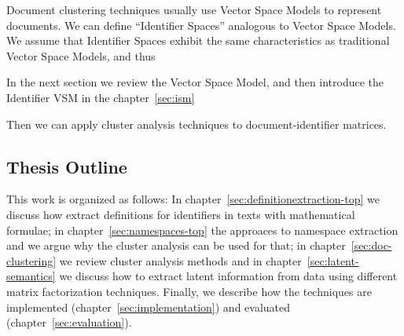 Document clustering techniques usually use Vector Space Models
\cite{oikonomakou2005review} \cite{aggarwal2012survey} to represent documents.
We can define ``Identifier Spaces'' analogous to Vector Space Models.
We assume that Identifier Spaces exhibit the same characteristics as
traditional Vector Space Models, and thus

In the next section we review the Vector Space Model,
and then introduce the Identifier VSM in the chapter~\ref{sec:ism}

Then we can apply cluster analysis techniques to document-identifier matrices.








\subsection{Thesis Outline}


This work is organized as follows:
In chapter~\ref{sec:definitionextraction-top} we discuss how extract
definitions for identifiers in texts with mathematical formulae;
in chapter~\ref{sec:namespaces-top} the approaces to namespace
extraction and we argue why the cluster analysis can be used for that;
in chapter~\ref{sec:doc-clustering} we review cluster analysis methods
and in chapter~\ref{sec:latent-semantics} we discuss how to extract
latent information from data using different matrix factorization
techniques. Finally, we describe how the techniques are implemented
(chapter~\ref{sec:implementation}) and evaluated (chapter~\ref{sec:evaluation}).

